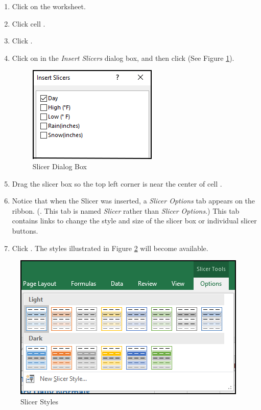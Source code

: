 \begin{enumerate}
	\item Click on the  worksheet. 
	\item Click cell .
	\item Click .
	\item Click on  in the \textit{Insert Slicers} dialog box, and then click  (See Figure \ref{05:fig20a}).

	\begin{figure}[H]
		\centering
		\includegraphics[width=\maxwidth{.50\linewidth}]{gfx/ch05_fig20a}
		\caption{Slicer Dialog Box}
		\label{05:fig20a}
	\end{figure}
	
	\item Drag the slicer box so the top left corner is near the center of cell .
	\item Notice that when the Slicer was inserted, a \textit{Slicer Options} tab appears on the ribbon. (. This tab is named \textit{Slicer} rather than \textit{Slicer Options}.) This tab contains links to change the style and size of the slicer box or individual slicer buttons.
	\item Click . The styles illustrated in Figure \ref{05:fig20} will become available.
\end{enumerate}

\begin{figure}[H]
	\centering
	\includegraphics[width=\maxwidth{.95\linewidth}]{gfx/ch05_fig20}
	\caption{Slicer Styles}
	\label{05:fig20}
\end{figure}


